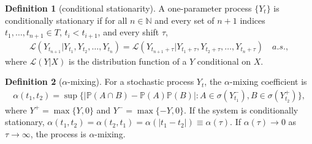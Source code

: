 \documentclass[12pt]{article}
\def\naturals{\mathbb{N}}
\def\mc#1{\mathcal{#1}} %
\def\mc#1{\mathcal{#1}}
\def\P{\mathbb{P}}
\theoremstyle{definition}
\theoremstyle{definition}
\newtheorem{definition}{Definition}
\begin{document}
\begin{definition}[conditional stationarity]
  A one-parameter process $\{Y_t\}$ is conditionally stationary if for all $n\in \naturals$ and every set of $n+1$ indices $t_1, \ldots, t_{n+1}\in T$, $t_i < t_{i+1}$, and every shift $\tau$,
  \begin{align*}
    \mc{L}(Y_{t_{n+1}}|Y_{t_1}, Y_{t_2}, \ldots, Y_{t_n})
    = \mc{L}(Y_{t_{n+1}+\tau}|Y_{t_1+\tau }, Y_{t_2+\tau }, \ldots, Y_{t_n+\tau })
    \quad a.s.,
  \end{align*}
  where $\mc{L}(Y|X)$ is the distribution function of a $Y$ conditional on $X$.
\end{definition}



\begin{definition}[$\alpha$-mixing]
  For a stochastic process $Y_t$, the $\alpha$-mixing coefficient is 
  \begin{align*}
    \alpha(t_1, t_2) = \sup \{
    |\P(A\cap B)-\P(A)\P(B)|\colon A\in \sigma(Y_{t_1}^{-}), B\in \sigma(Y_{t_2}^{+})\},
  \end{align*}
  where $Y^{+}=\max\{Y, 0\}$ and $Y^{-}=\max\{-Y, 0\}$. 
  If the system is conditionally stationary, $\alpha(t_1, t_2)=\alpha(t_2, t_1)=\alpha(|t_1-t_2|)\equiv \alpha(\tau)$. If $\alpha(\tau)\to 0$ as $\tau \to \infty$, the process is $\alpha$-mixing.
\end{definition}




  
\end{document}

